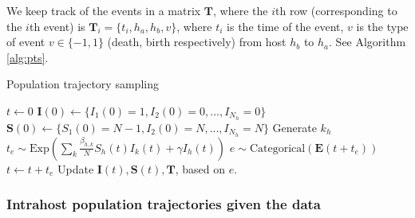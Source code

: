 \documentclass[]{report}
\begin{document}
We keep track of the events in a matrix $\mathbf{T}$, where the $i$th row (corresponding to the $i$th event) is $\mathbf{T}_i=\{t_i, h_a, h_b, v\}$, where $t_i$ is the time of the event,
$v$ is the type of event $v \in \{-1,1\}$ (death, birth respectively) from host $h_b$ to $h_a$. See Algorithm \ref{alg:pts}.
\begin{algorithm}
\caption{Population trajectory sampling \label{alg:pts}}
\begin{algorithmic}
\STATE $t\gets 0$
\STATE $\mathbf{I}(0)\gets\{I_1(0)=1, I_2(0)=0, ..., I_{N_h}=0\}$
\STATE $\mathbf{S}(0)\gets\{S_1(0)=N-1, I_2(0)=N, ..., I_{N_h}=N\}$
\STATE Generate $k_h$
\STATE $t_e \sim \textrm{Exp}(\sum_k \frac{\beta_{h,k}}{N}S_h(t)I_k(t) + \gamma I_h(t))$ 
\STATE $e \sim \text{Categorical}(\mathbf{E}(t+t_e))$  
\STATE $t \gets t+t_e$
\STATE Update $\mathbf{I}(t), \mathbf{S}(t), \mathbf{T}$, based on $e$.
\ENDWHILE
\end{algorithmic}
\end{algorithm}

\subsubsection{Intrahost population trajectories given the data}
\end{document}

